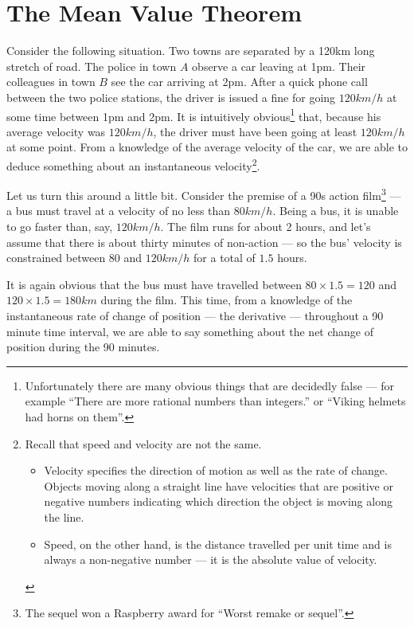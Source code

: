 \section{The Mean Value Theorem}\label{sec mvt}
Consider the following situation. Two towns are separated by a 120km long stretch of road.
The police in town $A$ observe a car leaving at 1pm. Their colleagues in town $B$ see the
car arriving at 2pm. After a quick phone call between the two police stations, the driver
is issued a fine for going $120km/h$ at some time between 1pm and 2pm. It is intuitively
obvious\footnote{Unfortunately there are many obvious things that are decidedly false ---
for example ``There are more rational numbers than integers.'' or ``Viking helmets had
horns on them''.} that, because his average velocity was $120km/h$, the driver
must have been going at least $120km/h$ at some point. From a knowledge of the
average velocity of the car, we are able to deduce something about an
instantaneous velocity\footnote{
Recall that speed and velocity are not the same.
\begin{itemize}
 \item Velocity specifies the direction of motion as well as the rate of
change. Objects moving along a straight line have velocities that are positive
or negative numbers indicating  which direction the object is moving along the
line.
 \item Speed, on the other hand, is the distance travelled per unit time and is
always a non-negative number --- it is the absolute value of velocity.
\end{itemize}
}.


Let us turn this around a little bit. Consider the premise of a 90s action
film\footnote{The sequel won a Raspberry award for ``Worst remake or sequel''.} --- a
bus must travel at a velocity of no less than $80km/h$. Being a bus, it is unable to go
faster than, say, $120km/h$. The film runs for about 2 hours, and let's assume that there
is about thirty minutes of non-action --- so the bus' velocity is constrained between
$80$ and $120km/h$ for a total of $1.5$ hours.

It is again obvious that the bus must have travelled between $80 \times 1.5 = 120$ and
$120\times 1.5 = 180km$ during the film. This time, from a knowledge of the instantaneous
rate of change of position --- the derivative --- throughout a 90 minute time
interval, we are able to say something about the net change of position during the 90
minutes.

